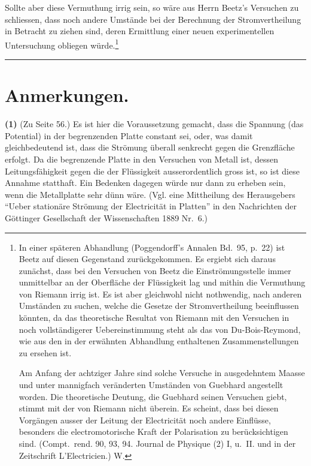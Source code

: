 \documentclass[12pt,a4paper]{book}
\theoremstyle{definition}
\theoremstyle{remark}
\begin{document}
Sollte aber diese Vermuthung irrig sein, so wäre aus Herrn Beetz's Versuchen zu schliessen, dass noch andere Umstände bei der Berechnung der Stromvertheilung in Betracht zu ziehen sind, deren Ermittlung einer neuen experimentellen Untersuchung obliegen würde.\footnote{In einer späteren Abhandlung (Poggendorff's Annalen Bd.~95, p.~22) ist Beetz auf diesen Gegenstand zurückgekommen. Es ergiebt sich daraus zunächst, dass bei den Versuchen von Beetz die Einströmungsstelle immer unmittelbar an der Oberfläche der Flüssigkeit lag und mithin die Vermuthung von Riemann irrig ist. Es ist aber gleichwohl nicht nothwendig, nach anderen Umständen zu suchen, welche die Gesetze der Stromvertheilung beeinflussen könnten, da das theoretische Resultat von Riemann mit den Versuchen in noch vollständigerer Uebereinstimmung steht als das von Du-Bois-Reymond, wie aus den in der erwähnten Abhandlung enthaltenen Zusammenstellungen zu ersehen ist.

Am Anfang der achtziger Jahre sind solche Versuche in ausgedehntem Maasse und unter mannigfach veränderten Umständen von Guebhard angestellt worden. Die theoretische Deutung, die Guebhard seinen Versuchen giebt, stimmt mit der von Riemann nicht überein. Es scheint, dass bei diesen Vorgängen ausser der Leitung der Electricität noch andere Einflüsse, besonders die electromotorische Kraft der Polarisation zu berücksichtigen sind. (Compt.~rend. 90, 93, 94. Journal de Physique (2) I, u.~II. und in der Zeitschrift L'Electricien.) W.}

\vspace{2em}
\begin{center}
\rule{0.5\textwidth}{0.4pt}
\end{center}
\vspace{1em}


\section*{Anmerkungen.}

\textbf{(1)} (Zu Seite 56.) Es ist hier die Voraussetzung gemacht, dass die Spannung (das Potential) in der begrenzenden Platte constant sei, oder, was damit gleichbedeutend ist, dass die Strömung überall senkrecht gegen die Grenzfläche erfolgt. Da die begrenzende Platte in den Versuchen von Metall ist, dessen Leitungsfähigkeit gegen die der Flüssigkeit ausserordentlich gross ist, so ist diese Annahme statthaft. Ein Bedenken dagegen würde nur dann zu erheben sein, wenn die Metallplatte sehr dünn wäre. (Vgl. eine Mittheilung des Herausgebers ``Ueber stationäre Strömung der Electricität in Platten'' in den Nachrichten der Göttinger Gesellschaft der Wissenschaften 1889 Nr.~6.)
\end{document}

